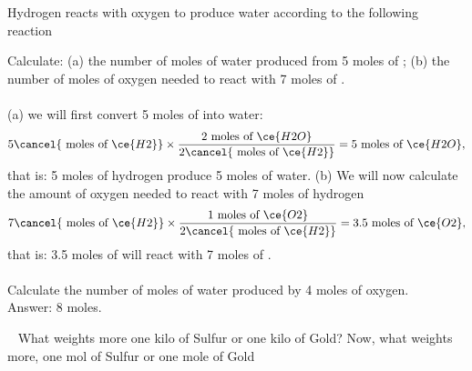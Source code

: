 \documentclass[main.tex]{subfiles}
\begin{document}
\begin{description}
\begin{example} %
Hydrogen reacts with oxygen to produce water according to the following reaction
\begin{center}\end{center}
Calculate: (a) the number of moles of water produced from 5 moles of ; (b) the number of moles of oxygen needed to react with 7 moles of .\\
\\
(a) we will first convert 5 moles of  into water:
\begin{equation*}
5\cancel{\text{ moles of }\ce{H2}} \times \dfrac{\text{2 moles of }\ce{H2O}}{2\cancel{\text{ moles of }\ce{H2}}}=5\text{ moles of }\ce{H2O},
\end{equation*}
that is: 5 moles of hydrogen produce 5 moles of water.
(b) We will now calculate the amount of oxygen needed to react with 7 moles of hydrogen
\begin{equation*}
7\cancel{\text{ moles of }\ce{H2}} \times \dfrac{\text{1 moles of }\ce{O2}}{2\cancel{\text{ moles of }\ce{H2}}}=3.5\text{ moles of }\ce{O2},
\end{equation*}
that is: 3.5 moles of  will react with 7 moles of .
\\
\faDiamond\ \\
Calculate the number of moles of water produced by 4 moles of oxygen. \\
\flushright Answer: 8 moles.
\end{example}%
\end{description}

	\begin{marginfigure}
\begin{tcolorbox}[enhanced,colback=red!5!white,colframe=black!50!red,boxrule=1pt,
  arc=0pt,outer arc=0pt,drop heavy lifted shadow]
\faGears\ 
 What weights more one kilo of Sulfur or one kilo of Gold? Now, what weights more, one mol of Sulfur or one mole of Gold \end{tcolorbox}
\end{marginfigure} 
\end{document}
